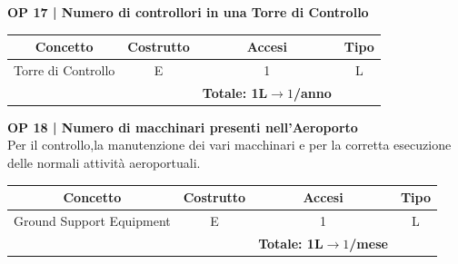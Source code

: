 \pagebreak


\textbf{\small OP 17 | Numero di controllori in una Torre di Controllo}\\

\begin{tabular}{ c c c c}
	\hline
	\rowcolor{airforceblue}
	\textbf{\color{white}Concetto} & \textbf{\color{white}Costrutto} & \textbf{\color{white}Accesi} & \textbf{\color{white}Tipo}\\
	\hline
	\textsf{\small Torre di Controllo} & \textsf{\small E} & \textsf{\small 1} &  \textsf{\small L}\\
	\hline
	\rowcolor{airforceblue}
	\textsf{\small } & \textsf{\small } & \textbf{\color{white}Totale: 1L$\rightarrow 1$/anno } \textsf{\small } & \textsf{\small }\\
	\hline
\end{tabular}

\vspace{.6cm}


\textbf{\small OP 18 | Numero di macchinari presenti nell'Aeroporto}\\

\textsf{\small Per il controllo,la manutenzione dei vari macchinari e per la corretta esecuzione delle normali attività aeroportuali.}\break

\begin{tabular}{ c c c c}
	\hline
	\rowcolor{airforceblue}
	\textbf{\color{white}Concetto} & \textbf{\color{white}Costrutto} & \textbf{\color{white}Accesi} & \textbf{\color{white}Tipo}\\
	\hline
	\textsf{\small Ground Support Equipment } & \textsf{\small E} & \textsf{\small 1} &  \textsf{\small L}\\
	\hline
	\rowcolor{airforceblue}
	\textsf{\small } & \textsf{\small } & \textbf{\color{white}Totale: 1L$\rightarrow 1$/mese } \textsf{\small } & \textsf{\small }\\
	\hline
\end{tabular}

\vspace{.6cm}



